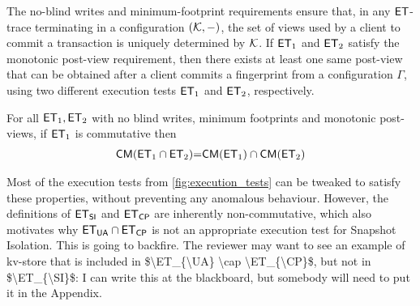 The no-blind writes and minimum-footprint requirements ensure that, in any $\mathsf{ET}$-trace 
terminating in a configuration $(\mathcal{K}, -)$, 
the set of views used by a client to commit a transaction is uniquely determined by $\mathcal{K}$. 
If $\mathsf{ET}_1$ and $\mathsf{ET}_2$ satisfy the monotonic post-view requirement, then there exists at least one  same post-view 
that can be obtained after a client commits a fingerprint from a configuration $\Gamma$, 
using two different execution tests $\mathsf{ET}_1$ and $\mathsf{ET}_2$, respectively. 

\begin{theorem}[Compositionality]     
For all $\mathsf{ET}_1, \mathsf{ET}_2$ with no blind writes, minimum footprints and monotonic post-views, 
if $\mathsf{ET}_1$ is commutative then
\begin{align*}
 \mathsf{CM}(\mathsf{ET}_1 \cap \mathsf{ET}_2) {=} \mathsf{CM}(\mathsf{ET}_1) \cap \mathsf{CM}(\mathsf{ET}_2)
\end{align*}
\end{theorem}
Most of the execution tests from \cref{fig:execution_tests} can be tweaked to satisfy these 
properties, without preventing any anomalous behaviour. However, the definitions 
of $\ET_{\SI}$ and $\mathsf{ET}_{\mathsf{CP}}$ are inherently non-commutative, which also motivates 
why $\ET_{\UA} \cap \ET_{\CP}$ is not an appropriate execution test for Snapshot Isolation.
\ac{This is going to backfire. The reviewer may want to 
see an example of kv-store that is included in $\ET_{\UA} \cap \ET_{\CP}$, but not in 
$\ET_{\SI}$: I can write this at the blackboard, but somebody will need to put it in the Appendix.}


